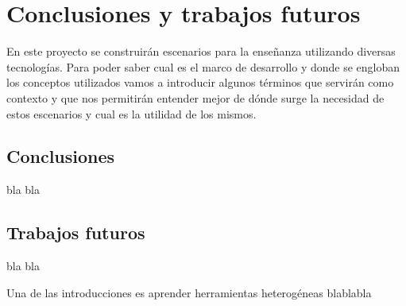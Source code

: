 \chapter{Conclusiones y trabajos futuros}
\label{ch:Conclusiones}

En este proyecto se construirán escenarios para la enseñanza utilizando diversas tecnologías. Para poder saber cual es el marco de desarrollo y donde se engloban los conceptos utilizados vamos a introducir algunos términos que servirán como contexto y que nos permitirán entender mejor de dónde surge la necesidad de estos escenarios y cual es la utilidad de los mismos.

\section{Conclusiones}
\label{sec:cn_conclusiones}

bla bla

\section{Trabajos futuros}
\label{sec:cn_trabajosfuturos}

bla bla










Una de las introducciones es aprender herramientas heterogéneas  blablabla